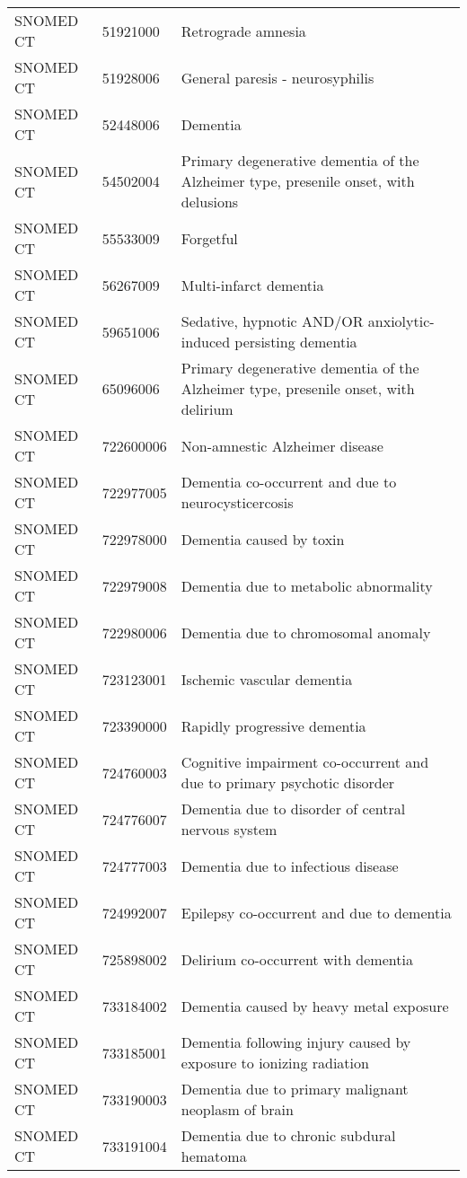 \begin{longtable}{p{}p{}p{}}
  SNOMED CT & 51921000 & Retrograde amnesia \\ 
  SNOMED CT & 51928006 & General paresis - neurosyphilis \\ 
  SNOMED CT & 52448006 & Dementia \\ 
  SNOMED CT & 54502004 & Primary degenerative dementia of the Alzheimer type, presenile onset, with delusions \\ 
  SNOMED CT & 55533009 & Forgetful \\ 
  SNOMED CT & 56267009 & Multi-infarct dementia \\ 
  SNOMED CT & 59651006 & Sedative, hypnotic AND/OR anxiolytic-induced persisting dementia \\ 
  SNOMED CT & 65096006 & Primary degenerative dementia of the Alzheimer type, presenile onset, with delirium \\ 
  SNOMED CT & 722600006 & Non-amnestic Alzheimer disease \\ 
  SNOMED CT & 722977005 & Dementia co-occurrent and due to neurocysticercosis \\ 
  SNOMED CT & 722978000 & Dementia caused by toxin \\ 
  SNOMED CT & 722979008 & Dementia due to metabolic abnormality \\ 
  SNOMED CT & 722980006 & Dementia due to chromosomal anomaly \\ 
  SNOMED CT & 723123001 & Ischemic vascular dementia \\ 
  SNOMED CT & 723390000 & Rapidly progressive dementia \\ 
  SNOMED CT & 724760003 & Cognitive impairment co-occurrent and due to primary psychotic disorder \\ 
  SNOMED CT & 724776007 & Dementia due to disorder of central nervous system \\ 
  SNOMED CT & 724777003 & Dementia due to infectious disease \\ 
  SNOMED CT & 724992007 & Epilepsy co-occurrent and due to dementia \\ 
  SNOMED CT & 725898002 & Delirium co-occurrent with dementia \\ 
  SNOMED CT & 733184002 & Dementia caused by heavy metal exposure \\ 
  SNOMED CT & 733185001 & Dementia following injury caused by exposure to ionizing radiation \\ 
  SNOMED CT & 733190003 & Dementia due to primary malignant neoplasm of brain \\ 
  SNOMED CT & 733191004 & Dementia due to chronic subdural hematoma \\ 

\end{longtable}
